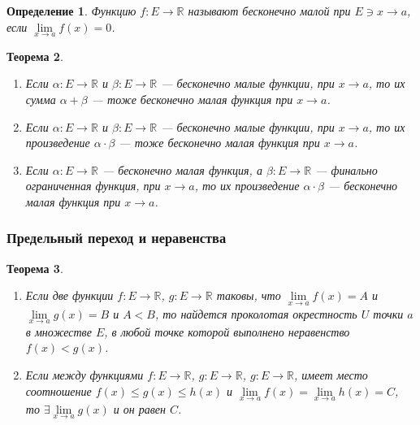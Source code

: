 \documentclass[12pt]{report}
\theoremstyle{plain}
\newtheorem{theorem}{Теорема}[chapter]
\newtheorem{definition}[theorem]{Определение}
\newcommand{\R}{\mathbb R}
\begin{document}
\begin{definition}
  Функцию $f: E \rightarrow \R$ называют бесконечно малой при $E \ni x \rightarrow a$,
  если $\lim\limits_{x\rightarrow a} f(x) = 0$.
\end{definition}

\begin{theorem}
\begin{enumerate}
  \item Если $\alpha: E \rightarrow \R$ и $\beta: E \rightarrow \R$ --- бесконечно малые функции,
    при $x \rightarrow a$, то их сумма $\alpha + \beta$ --- тоже бесконечно малая функция при $x \rightarrow a$.
  \item Если $\alpha: E \rightarrow \R$ и $\beta: E \rightarrow \R$ --- бесконечно малые функции,
    при $x \rightarrow a$, то их произведение $\alpha \cdot \beta$ --- тоже бесконечно малая функция при $x \rightarrow a$.
  \item Если $\alpha: E \rightarrow \R$ --- бесконечно малая функция,
    а $\beta: E \rightarrow \R$ --- финально ограниченная функция,
    при $x \rightarrow a$, то их произведение $\alpha \cdot \beta$ --- бесконечно малая функция при $x \rightarrow a$.
\end{enumerate}
\end{theorem}

\subsubsection{Предельный переход и неравенства}
\begin{theorem}
  \begin{enumerate}
    \item  Если две функции $f: E \rightarrow \R$, $g: E \rightarrow \R$ таковы,
      что $\lim\limits_{x\rightarrow a} f(x) = A$ и $\lim\limits_{x\rightarrow a} g(x) = B$ и
      $A < B$, то найдется проколотая окрестность $U$ точки $a$ в множестве $E$, в любой
      точке которой выполнено неравенство $f(x) < g(x)$.
    \item  Если между функциями  $f: E \rightarrow \R$, $g: E \rightarrow \R$, $g: E \rightarrow \R$,
      имеет место соотношение $f(x) \le g(x) \le h(x)$ и
      $\lim\limits_{x\rightarrow a} f(x) = \lim\limits_{x\rightarrow a} h(x) = C$,
      то $\exists \lim\limits_{x\rightarrow a} g(x)$ и он равен $C$.
  \end{enumerate}
\end{theorem}

\end{document}
